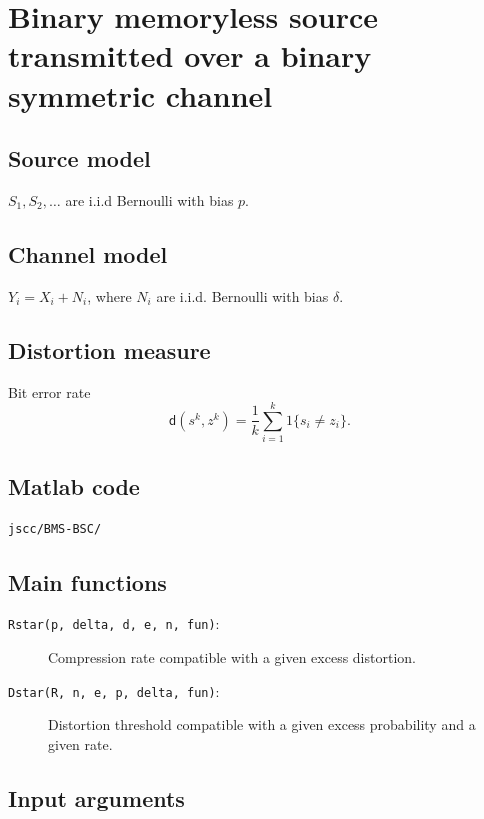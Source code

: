 \documentclass[a4paper,11p]{memoir}
\begin{document}
\section{Binary memoryless source transmitted over a binary symmetric channel}

\subsection{Source model}
$ S_1, S_2, \ldots $ are i.i.d Bernoulli with bias $p$. 


\subsection{Channel model}
$Y_i = X_i + N_i$, where $N_i$ are i.i.d. Bernoulli with bias $\delta$. 


\subsection{Distortion measure}
Bit error rate $$\mathsf d(s^k, z^k) = \frac 1 k \sum_{i = 1}^k 1\{s_i \neq z_i\}.$$

\subsection{Matlab code}
 \verb|jscc/BMS-BSC/|


\subsection{Main functions}
\begin{description}
\item[\texttt{Rstar(p, delta, d, e, n, fun)}:]  Compression rate compatible with a given excess distortion. 
\item[\texttt{Dstar(R, n, e, p, delta, fun)}:]  Distortion threshold compatible with a given excess probability and a given rate. 
\end{description}

\subsection{Input arguments}
\end{document}
